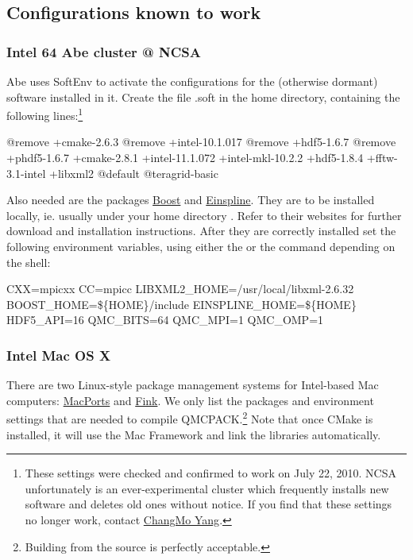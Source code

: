 
\subsection{Configurations known to work}
\subsubsection{Intel 64 Abe cluster @ NCSA}
Abe uses SoftEnv to activate the configurations for the (otherwise dormant) software installed in it.  Create the file .soft in the home directory, containing the following lines:\footnote{These settings were checked and confirmed to work on July 22, 2010.  NCSA unfortunately is an ever-experimental cluster which frequently installs new software and deletes old ones without notice.  If you find that these settings no longer work, contact \href{mailto:dcyang2@illinois.edu}{ChangMo Yang}.}
\begin{term}
@remove +cmake-2.6.3
@remove +intel-10.1.017
@remove +hdf5-1.6.7
@remove +phdf5-1.6.7
+cmake-2.8.1
+intel-11.1.072
+intel-mkl-10.2.2
+hdf5-1.8.4
+fftw-3.1-intel
+libxml2
@default
@teragrid-basic
\end{term}
Also needed are the packages \href{http://www.boost.org/}{Boost} and \href{http://einspline.sourceforge.net/}{Einspline}.  They are to be installed locally, ie. usually under your home directory .  Refer to their websites for further download and installation instructions.  After they are correctly installed set the following environment variables, using either the  or the  command depending on the shell:
\begin{term}
CXX=mpicxx
CC=mpicc
LIBXML2_HOME=/usr/local/libxml-2.6.32
BOOST_HOME=\$\{HOME\}/include
EINSPLINE_HOME=\$\{HOME\}
HDF5_API=16
QMC_BITS=64
QMC_MPI=1
QMC_OMP=1
\end{term}

\subsubsection{Intel Mac OS X}
There are two Linux-style package management systems for Intel-based Mac computers: \href{http://www.macports.org/}{MacPorts} and \href{http://www.finkproject.org/}{Fink}.  We only list the packages and environment settings that are needed to compile QMCPACK.\footnote{Building from the source is perfectly acceptable.}  Note that once CMake is installed, it will use the Mac Framework and link the libraries automatically.
